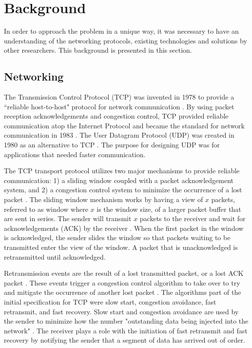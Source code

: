 \chapter{Background}

In order to approach the problem in a unique way, it was necessary to have an understanding of the networking protocols, existing technologies and solutions by other researchers. This background is presented in this section.

\section{Networking}

The Transmission Control Protocol (TCP) was invented in 1978 to provide a ``reliable host-to-host" protocol for network communication \cite{cerf1978specification}. By using packet reception acknowledgements and congestion control, TCP provided reliable communication atop the Internet Protocol and became the standard for network communication in 1983 \cite{andrews2013who}. The User Datagram Protocol (UDP) was created in 1980 as an alternative to TCP \cite{postel1980user}\cite{kozierokr2005udp}. The purpose for designing UDP was for applications that needed faster communication.

The TCP transport protocol utilizes two major mechanisms to provide reliable communication: 1) a sliding window coupled with a packet acknowledgement system, and 2) a congestion control system to minimize the occurrence of a lost packet \cite{cerf1978specification}. The sliding window mechanism works by having a view of $x$ packets, referred to as window where $x$ is the window size, of a larger packet buffer that are sent in series. The sender will transmit $x$ packets to the receiver and wait for acknowledgements (ACK) by the receiver \cite{cerf1978specification}. When the first packet in the window is acknowledged, the sender slides the window so that packets waiting to be transmitted enter the view of the window. A packet that is unacknowledged is retransmitted until acknowledged.

Retransmission events are the result of a lost transmitted packet, or a lost ACK packet \cite{cerf1978specification}. These events trigger a congestion control algorithm to take over to try and mitigate the occurrence of another lost packet \cite{allman2009tcp}. The algorithms part of the initial specification for TCP were slow start, congestion avoidance, fast retransmit, and fast recovery. Slow start and congestion avoidance are used by the sender to minimize how the number "outstanding data being injected into the network" \cite{allman2009tcp}. The receiver plays a role with the initiation of fast retransmit and fast recovery by notifying the sender that a segment of data has arrived out of order.

